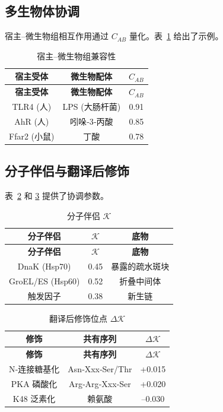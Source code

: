 \documentclass[12pt,a4paper]{article}
\newcommand{\REL}{\mathcal{K}}          %
\begin{document}
	\subsection{多生物体协调}
	宿主–微生物组相互作用通过 \(C_{AB}\) 量化。表~\ref{tab:microbiome} 给出了示例。
	
	\begin{longtable}{|c|c|c|}
		\caption{宿主–微生物组兼容性}\label{tab:microbiome}\\
		\hline
		\textbf{宿主受体} & \textbf{微生物配体} & \(C_{AB}\) \\
		\hline
		\endfirsthead
		\hline
		\textbf{宿主受体} & \textbf{微生物配体} & \(C_{AB}\) \\
		\hline
		\endhead
		\hline
		TLR4 (人) & LPS (大肠杆菌) & 0.91 \\
		AhR (人) & 吲哚‑3‑丙酸 & 0.85 \\
		Ffar2 (小鼠) & 丁酸 & 0.78 \\
		\hline
	\end{longtable}
	
	\subsection{分子伴侣与翻译后修饰}
	表~\ref{tab:chaperones} 和 \ref{tab:ptm} 提供了协调参数。
	
	\begin{longtable}{|c|c|c|}
		\caption{分子伴侣 \(\REL\)}\label{tab:chaperones}\\
		\hline
		\textbf{分子伴侣} & \(\REL\) & \textbf{底物} \\
		\hline
		\endfirsthead
		\hline
		\textbf{分子伴侣} & \(\REL\) & \textbf{底物} \\
		\hline
		\endhead
		\hline
		DnaK (Hsp70) & 0.45 & 暴露的疏水斑块 \\
		GroEL/ES (Hsp60) & 0.52 & 折叠中间体 \\
		触发因子 & 0.38 & 新生链 \\
		\hline
	\end{longtable}
	
	\begin{longtable}{|c|c|c|}
		\caption{翻译后修饰位点 \(\Delta \REL\)}\label{tab:ptm}\\
		\hline
		\textbf{修饰} & \textbf{共有序列} & \(\Delta \REL\) \\
		\hline
		\endfirsthead
		\hline
		\textbf{修饰} & \textbf{共有序列} & \(\Delta \REL\) \\
		\hline
		\endhead
		\hline
		N‑连接糖基化 & Asn‑Xxx‑Ser/Thr & +0.015 \\
		PKA 磷酸化 & Arg‑Arg‑Xxx‑Ser & +0.020 \\
		K48 泛素化 & 赖氨酸 & –0.030 \\
		\hline
	\end{longtable}
	
\end{document}
